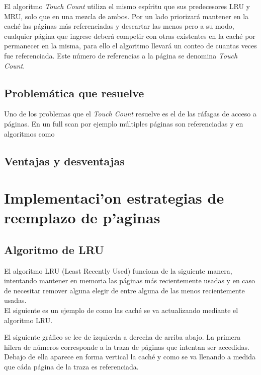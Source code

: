 \documentclass[11pt, a4paper, spanish]{article}
\begin{document}
El algoritmo \textit{Touch Count} utiliza el mismo esp\'iritu que sus predecesores LRU y MRU, solo que en una mezcla de ambos. Por un lado priorizar\'a
mantener en la cach\'e las p\'aginas m\'as referenciadas y descartar las menos pero a su modo, cualquier p\'agina que ingrese deber\'a competir 
con otras existentes en la cach\'e por permanecer en la misma, para ello el algoritmo llevará un conteo de cuantas veces fue referenciada. Este n\'umero
de referencias a la p\'agina se denomina \textit{Touch Count}.

\subsection{Problem\'atica que resuelve}

Uno de los problemas que el \textit{Touch Count} resuelve es el de las r\'afagas de acceso a p\'aginas. En un full scan por ejemplo m\'ultiples p\'aginas
son referenciadas y en algoritmos como 

\subsection{Ventajas y desventajas}

\newpage 
\section{Implementaci'on estrategias de reemplazo de p'aginas}

\subsection{Algoritmo de LRU}

El algoritmo LRU (Least Recently Used) funciona de la siguiente manera, intentando mantener en memoria las p\'aginas m\'as recientemente usadas
y en caso de necesitar remover alguna elegir de entre alguna de las menos recientemente usadas.\\

El siguiente es un ejemplo de como las cach\'e se va actualizando mediante el algoritmo LRU.

El siguiente gr\'afico se lee de izquierda a derecha de arriba abajo. La primera hilera de n\'umeros corresponde a la traza de p\'aginas que intentan ser 
accedidas. Debajo de ella aparece en forma vertical la cach\'e y como se va llenando a medida que c\'ada p\'agina de la traza es referenciada.\\ 
\end{document}
